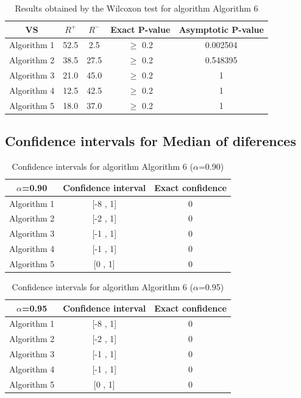 \documentclass[a4paper,10pt]{article}
\begin{document}
\begin{table}[!htp]
\centering\small
\begin{tabular}{
|c|c|c|c|c|}
\hline
 VS & $R^{+}$ & $R^{-}$ & Exact P-value & Asymptotic P-value \\ \hline 
Algorithm 1 & 52.5 & 2.5 & $\geq$ 0.2 & 0.002504\\ \hline 
Algorithm 2 & 38.5 & 27.5 & $\geq$ 0.2 & 0.548395\\ \hline 
Algorithm 3 & 21.0 & 45.0 & $\geq$ 0.2 & 1\\ \hline 
Algorithm 4 & 12.5 & 42.5 & $\geq$ 0.2 & 1\\ \hline 
Algorithm 5 & 18.0 & 37.0 & $\geq$ 0.2 & 1\\ \hline 

\end{tabular}
\caption{Results obtained by the Wilcoxon test for algorithm Algorithm 6}
\end{table}

\subsection{Confidence intervals for Median of diferences}

\begin{table}[!htp]
\centering\small
\begin{tabular}{
|c|c|c|}
\hline
 $\alpha$=0.90 & Confidence interval & Exact confidence \\ \hline 
Algorithm 1 & [-8 , 1] & 0\\ \hline 
Algorithm 2 & [-2 , 1] & 0\\ \hline 
Algorithm 3 & [-1 , 1] & 0\\ \hline 
Algorithm 4 & [-1 , 1] & 0\\ \hline 
Algorithm 5 & [0 , 1] & 0\\ \hline 

\end{tabular}
\caption{Confidence intervals for algorithm Algorithm 6 ($\alpha$=0.90)}
\end{table}
\begin{table}[!htp]
\centering\small
\begin{tabular}{
|c|c|c|}
\hline
 $\alpha$=0.95 & Confidence interval & Exact confidence \\ \hline 
Algorithm 1 & [-8 , 1] & 0\\ \hline 
Algorithm 2 & [-2 , 1] & 0\\ \hline 
Algorithm 3 & [-1 , 1] & 0\\ \hline 
Algorithm 4 & [-1 , 1] & 0\\ \hline 
Algorithm 5 & [0 , 1] & 0\\ \hline 

\end{tabular}
\caption{Confidence intervals for algorithm Algorithm 6 ($\alpha$=0.95)}
\end{table}

 \clearpage 
\end{document}
